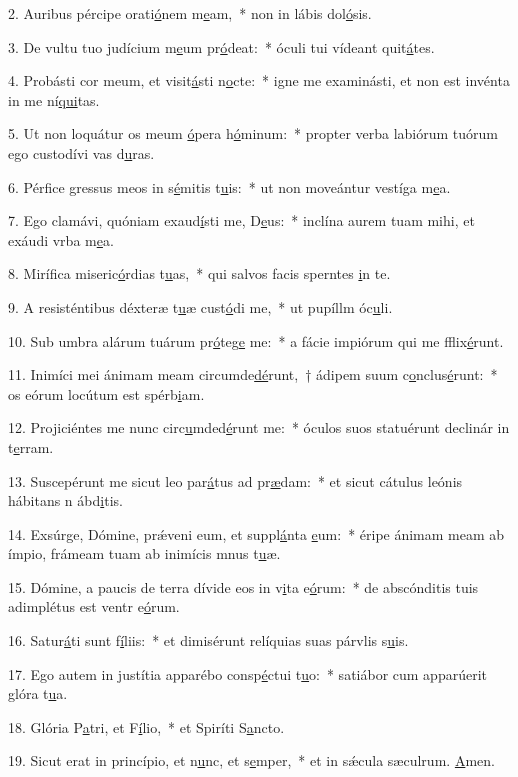 2. Auribus pércipe orati\uline{ó}nem m\uline{e}am,~* non in lábis dol\uline{ó}sis.\par 
3. De vultu tuo judícium m\uline{e}um pr\uline{ó}deat:~* óculi tui vídeant quit\uline{á}tes.\par 
4. Probásti cor meum, et visit\uline{á}sti n\uline{o}cte:~* igne me examinásti, et non est invénta in me ní\uline{qui}tas.\par 
5. Ut non loquátur os meum \uline{ó}pera h\uline{ó}minum:~* propter verba labiórum tuórum ego custodívi vas d\uline{u}ras.\par 
6. Pérfice gressus meos in s\uline{é}mitis t\uline{u}is:~* ut non moveántur vestíga m\uline{e}a.\par 
7. Ego clamávi, quóniam exaud\uline{í}sti me, D\uline{e}us:~* inclína aurem tuam mihi, et exáudi vrba m\uline{e}a.\par 
8. Mirífica miseric\uline{ó}rdias t\uline{u}as,~* qui salvos facis sperntes \uline{i}n te.\par 
9. A resisténtibus déxteræ t\uline{u}æ cust\uline{ó}di me,~* ut pupíllm óc\uline{u}li.\par 
10. Sub umbra alárum tuárum pr\uline{ó}teg\uline{e} me:~* a fácie impiórum qui me fflix\uline{é}runt.\par 
11. Inimíci mei ánimam meam circumde\uline{dé}runt,~† ádipem suum c\uline{o}nclus\uline{é}runt:~* os eórum locútum est spérb\uline{i}am.\par 
12. Projiciéntes me nunc circ\uline{u}mded\uline{é}runt me:~* óculos suos statuérunt declinár in t\uline{e}rram.\par 
13. Suscepérunt me sicut leo par\uline{á}tus ad pr\uline{æ}dam:~* et sicut cátulus leónis hábitans n ábd\uline{i}tis.\par 
14. Exsúrge, Dómine, prǽveni eum, et suppl\uline{á}nta \uline{e}um:~* éripe ánimam meam ab ímpio, frámeam tuam ab inimícis mnus t\uline{u}æ.\par 
15. Dómine, a paucis de terra dívide eos in v\uline{i}ta e\uline{ó}rum:~* de abscónditis tuis adimplétus est ventr e\uline{ó}rum.\par 
16. Satur\uline{á}ti sunt f\uline{í}liis:~* et dimisérunt relíquias suas párvlis s\uline{u}is.\par 
17. Ego autem in justítia apparébo consp\uline{é}ctui t\uline{u}o:~* satiábor cum apparúerit glóra t\uline{u}a.\par 
18. Glória P\uline{a}tri, et F\uline{í}lio,~* et Spiríti S\uline{a}ncto.\par 
19. Sicut erat in princípio, et n\uline{u}nc, et s\uline{e}mper,~* et in sǽcula sæculrum. \uline{A}men.\par 
